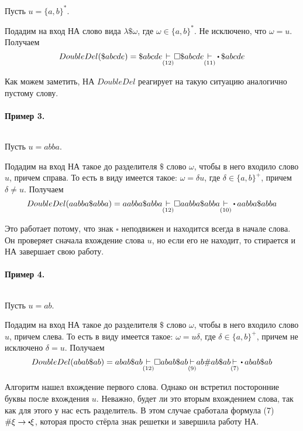 Пусть $u = \{a,b\}^{*}$.

Подадим на вход НА слово вида $\lambda\$\omega$, где  $\omega \in \{a,b\}^{*}$. Не исключено,
что $\omega = u$. Получаем
\[
    DoubleDel(\$abcde) = \$abcde \underset{(12)}{\step} \square\$abcde 
    \underset{(11)}{\step}\bigcdot \$abcde
\] 

Как можем заметить, НА $DoubleDel$ реагирует на такую ситуацию аналогично пустому слову.


\paragraph*{Пример 3.} ${}$ \newline

Пусть $u = abba$.

Подадим на вход НА такое до разделителя $\$$ слово $\omega$,
чтобы в него входило слово  $u$, причем справа. То есть
в виду имеется такое:  $\omega = \delta u$, где  $\delta \in \{a,b\}^{+}$, причем 
$\delta \neq  u$. Получаем
\[
    DoubleDel(aabba\$abba) = aabba\$abba \underset{(12)}{\step} \square aabba\$abba
    \underset{(10)}{\step}\bigcdot aabba\$abba
\]

Это работает потому, что знак $\square$ неподвижен и находится всегда в начале слова.
Он проверяет сначала вхождение слова  $u$, но если его не находит, то стирается и НА завершает
свою работу.


\paragraph*{Пример 4.} ${}$ \newline

Пусть $u = ab$.

Подадим на вход НА такое до разделителя $\$$ слово  $\omega$,
чтобы в него входило слово  $u$, причем слева. То есть
в виду имеется такое:  $\omega = u\delta$, где  $\delta \in \{a,b\}^{+} $, причем
не исключено $\delta = u$. Получаем
\[
    DoubleDel(abab\$ab) = abab\$ab \underset{(12)}{\step} \square abab\$ab
    \underset{(9)}{\step} ab\#ab\$ab \underset{(7)}{\step}\bigcdot abab\$ab
\]

Алгоритм нашел вхождение первого слова. Однако он встретил посторонние буквы после вхождения
$u$. Неважно, будет ли это вторым вхождением слова, так как для этого у нас есть разделитель.
В этом случае сработала формула (7)  $\#\xi \to \bigcdot \xi$, которая просто стёрла знак
решетки и завершила работу НА.



